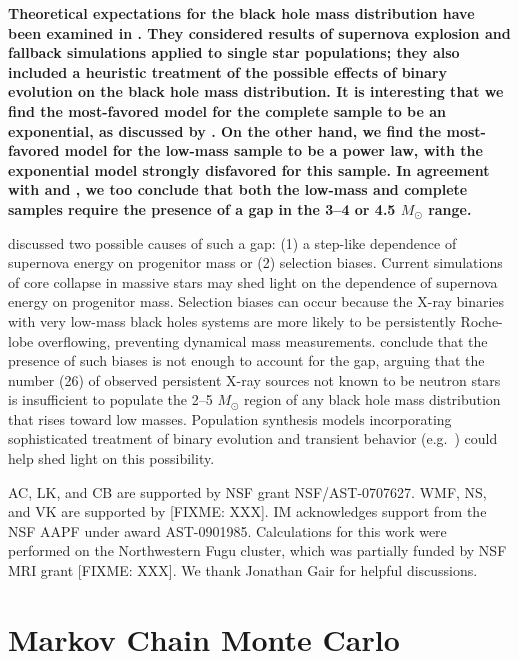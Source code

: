 \documentclass[preprint]{aastex}
\newcommand{\fixme}[1]{[FIXME: #1]}
\newcommand{\Msun}{M_\odot}
\newcommand{\changed}[1]{{\bf #1 }}
\begin{document}
\changed{Theoretical expectations for the black hole mass distribution
  have been examined in \citet{Fryer2001}.  They considered results of
  supernova explosion and fallback simulations \citep{Fryer1999}
  applied to single star populations; they also included a heuristic
  treatment of the possible effects of binary evolution on the black
  hole mass distribution.  It is interesting that we find the
  most-favored model for the complete sample to be an exponential, as
  discussed by \citet{Fryer1999}.  On the other hand, we find the
  most-favored model for the low-mass sample to be a power law, with
  the exponential model strongly disfavored for this sample. In
  agreement with \citet{Bailyn1998} and \citet{Ozel2010}, we too
  conclude that both the low-mass and complete samples require the
  presence of a gap in the 3--4 or 4.5 $\Msun$ range.

  \citet{Fryer1999} discussed two possible causes of such a gap: (1) a
  step-like dependence of supernova energy on progenitor mass or (2)
  selection biases.  Current simulations of core collapse in massive
  stars may shed light on the dependence of supernova energy on
  progenitor mass.  Selection biases can occur because the X-ray
  binaries with very low-mass black holes systems are more likely to
  be persistently Roche-lobe overflowing, preventing dynamical mass
  measurements.  \citet{Ozel2010} conclude that the presence of such
  biases is not enough to account for the gap, arguing that the number
  (26) of observed persistent X-ray sources not known to be neutron
  stars is insufficient to populate the 2--5 $\Msun$ region of any
  black hole mass distribution that rises toward low masses.
  Population synthesis models incorporating sophisticated treatment of
  binary evolution and transient behavior (e.g.\
  \citet{Fragos2008,Fragos2009}) could help shed light on this
  possibility.}

\acknowledgements

AC, LK, and CB are supported by NSF grant NSF/AST-0707627.  WMF, NS,
and VK are supported by \fixme{XXX}.  IM acknowledges support from the
NSF AAPF under award AST-0901985.  Calculations for this work were
performed on the Northwestern Fugu cluster, which was partially funded
by NSF MRI grant \fixme{XXX}.  We thank Jonathan Gair for helpful
discussions.

\appendix

\section{Markov Chain Monte Carlo}
\label{sec:mcmc}
\end{document}
